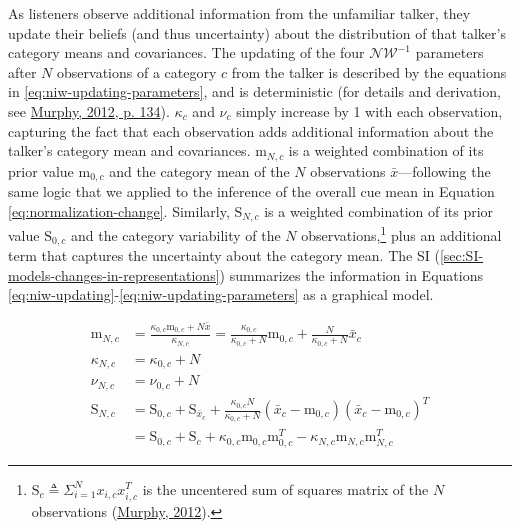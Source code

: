 \documentclass[
  11pt,
  english,
  man,floatsintext]{apa6}
\begin{document}
As listeners observe additional information from the unfamiliar talker, they update their beliefs (and thus uncertainty) about the distribution of that talker's category means and covariances. The updating of the four \(\mathcal{NW^{-1}}\) parameters after \(N\) observations of a category \(c\) from the talker is described by the equations in \eqref{eq:niw-updating-parameters}, and is deterministic (for details and derivation, see \protect\hyperlink{ref-murphy2012}{Murphy, 2012, p. 134}). \(\kappa_c\) and \(\nu_c\) simply increase by 1 with each observation, capturing the fact that each observation adds additional information about the talker's category mean and covariances. \(\mathrm{m}_{N,c}\) is a weighted combination of its prior value \(\mathrm{m}_{0,c}\) and the category mean of the \(N\) observations \(\bar{x}\)---following the same logic that we applied to the inference of the overall cue mean in Equation \eqref{eq:normalization-change}. Similarly, \(\mathrm{S}_{N,c}\) is a weighted combination of its prior value \(\mathrm{S}_{0,c}\) and the category variability of the \(N\) observations,\footnote{\(\mathrm{S}_c \triangleq \Sigma_{i=1}^N x_{i,c} x_{i,c}^T\) is the uncentered sum of squares matrix of the \(N\) observations (\protect\hyperlink{ref-murphy2012}{Murphy, 2012}).} plus an additional term that captures the uncertainty about the category mean. The SI (\ref{sec:SI-models-changes-in-representations}) summarizes the information in Equations \eqref{eq:niw-updating}-\eqref{eq:niw-updating-parameters} as a graphical model.

\begin{equation}\label{eq:niw-updating-parameters}
\begin{split}
\mathrm{m}_{N,c} & = \frac{\kappa_{0,c} \mathrm{m}_{0,c} + N \bar{x}}{\kappa_{N,c}} = \frac{\kappa_{0,c}}{\kappa_{0,c} + N} \mathrm{m}_{0,c} + \frac{N}{\kappa_{0,c} + N}\bar{x}_c \\
\kappa_{N,c} & = \kappa_{0,c} + N \\
\nu_{N,c} & = \nu_{0,c} + N \\
\mathrm{S}_{N,c} & = \mathrm{S}_{0,c} + \mathrm{S}_{\bar{x}_c} + \frac{\kappa_{0,c} N}{\kappa_{0,c} + N}\left( \bar{x}_c-\mathrm{m}_{0,c} \right) \left( \bar{x}_c-\mathrm{m}_{0,c} \right)^T \\
 & = \mathrm{S}_{0,c} + \mathrm{S}_c + \kappa_{0,c} \mathrm{m}_{0,c} \mathrm{m}_{0,c}^T - \kappa_{N,c} \mathrm{m}_{N,c} \mathrm{m}_{N,c}^T
\end{split}
\end{equation}
\end{document}
